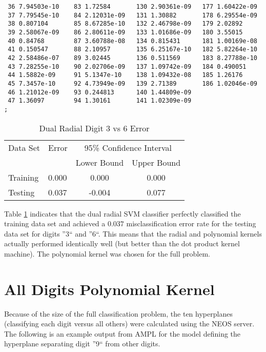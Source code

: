 \documentclass{article}
\begin{document}
\begin{verbatim}
 36 7.94503e-10    83 1.72584       130 2.90361e-09   177 1.60422e-09
 37 7.79545e-10    84 2.12031e-09   131 1.30882       178 6.29554e-09
 38 0.807104       85 8.67285e-10   132 2.46798e-09   179 2.02892
 39 2.58067e-09    86 2.80611e-09   133 1.01686e-09   180 3.55015
 40 0.84768        87 3.60788e-08   134 0.815431      181 1.00169e-08
 41 0.150547       88 2.10957       135 6.25167e-10   182 5.82264e-10
 42 2.58486e-07    89 3.02445       136 0.511569      183 8.27788e-10
 43 7.28255e-10    90 2.02706e-09   137 1.09742e-09   184 0.490051
 44 1.5882e-09     91 5.1347e-10    138 1.09432e-08   185 1.26176
 45 7.3457e-10     92 4.73949e-09   139 2.71389       186 1.02046e-09
 46 1.21012e-09    93 0.244813      140 1.44809e-09
 47 1.36097        94 1.30161       141 1.02309e-09
;

\end{verbatim}

\begin{table}\label{table4}
\caption{Dual Radial Digit 3 vs 6 Error}
\begin{center}
\begin{tabular}{llcc}
\toprule
Data Set & Error & \multicolumn{2}{c}{95\% Confidence Interval} \\
\cmidrule(r){3-4}
& & Lower Bound & Upper Bound \\
\midrule
Training & 0.000 & 0.000 & 0.000 \\
Testing & 0.037 & -0.004 & 0.077 \\
\bottomrule
\end{tabular}
\end{center}
\end{table}

Table \ref{table4} indicates that the dual radial SVM classifier perfectly classified the training data set and achieved a \(0.037\) misclassification error rate for the testing data set for digits ''3`` and ''6``. This means that the radial and polynomial kernels actually performed identically well (but better than the dot product kernel machine). The polynomial kernel was chosen for the full problem.

\section{All Digits Polynomial Kernel}\label{full1}

Because of the size of the full classification problem, the ten hyperplanes (classifying each digit versus all others) were calculated using the NEOS server. The following is an example output from AMPL for the model defining the hyperplane separating digit ''9`` from other digits.
\end{document}
